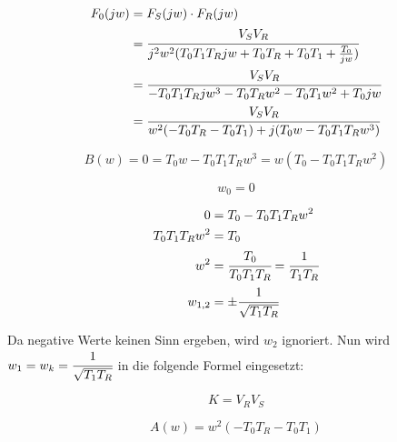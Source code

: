 \begin{equation} \label{eg2}
\begin{split}
 F_0(jw) &= F_S(jw) \cdot F_R(jw) \\
 &= \cfrac{V_S V_R}{j^2w^2(T_0T_1T_Rjw+T_0T_R+T_0T_1+\frac{T_0}{jw})} \\
 &= \cfrac{V_S V_R}{-T_0T_1T_Rjw^3-T_0T_Rw^2-T_0T_1w^2+T_0jw} \\
 &= \cfrac{V_S V_R}{w^2(-T_0T_R-T_0T_1)+j(T_0w-T_0T_1T_Rw^3)} \\
 \end{split}
\end{equation}

\begin{equation} \label{eq3}
  B(w) = 0 = T_0w-T_0T_1T_Rw^3 = w(T_0-T_0T_1T_Rw^2) 
\end{equation}

\begin{minipage}{.45\textwidth}
\begin{equation}
 w_0=0
\end{equation}
\end{minipage}
\begin{minipage}{.45\textwidth}
\begin{equation} \label{eq4}
\begin{split}
  0 &= T_0-T_0T_1T_Rw^2 \\
  T_0T_1T_Rw^2 &= T_0 \\
  w^2 &= \cfrac{T_0}{T_0T_1T_R} = \cfrac{1}{T_1T_R} \\
  w_{1,2} &= \pm \cfrac{1}{\sqrt{T_1T_R}}
\end{split}
\end{equation}
\end{minipage}

Da negative Werte keinen Sinn ergeben, wird $w_2$ ignoriert. Nun wird $w_1 = w_k = \cfrac{1}{\sqrt{T_1T_R}}$ in die folgende Formel eingesetzt:

\begin{minipage}{.45\textwidth}
\begin{equation} \label{k}
  K = V_RV_S 
\end{equation}
\end{minipage}
\begin{minipage}{.45\textwidth}
 \begin{equation} \label{aw}
  A(w) = w^2(-T_0T_R-T_0T_1)
\end{equation}
\end{minipage}

